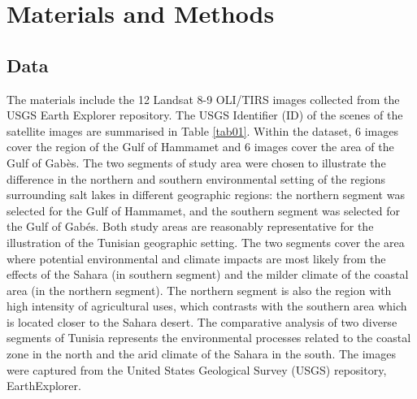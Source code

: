 \documentclass[land,article,accept,pdftex,moreauthors]{Definitions/mdpi}
\begin{document}
\section{Materials and Methods}

\subsection{Data}

The materials include the 12 Landsat 8-9 OLI/TIRS images collected from the USGS Earth Explorer repository. The USGS Identifier (ID) of the scenes of the satellite images are summarised in Table \ref{tab01}. Within the dataset, 6 images cover the region of the Gulf of Hammamet %
and 6 images cover the area of the Gulf of Gabès. {The two segments of study area were chosen to illustrate the difference in the northern and southern environmental setting of the regions surrounding salt lakes in different geographic regions: the northern segment was selected for the Gulf of Hammamet, and the southern segment was selected for the Gulf of Gab\'es. Both study areas are reasonably representative for the illustration of the Tunisian geographic setting. The two segments cover the area where potential environmental and climate impacts are most likely from the effects of the Sahara (in southern segment) and the milder climate of the coastal area (in the northern segment). The northern segment is also the region with high intensity of agricultural uses, which contrasts with the southern area which is located closer to the Sahara desert. The comparative analysis of two diverse segments of Tunisia represents the environmental processes related to the coastal zone in the north and the arid climate of the Sahara in the south. The images were captured from the United States Geological Survey (USGS) repository, EarthExplorer.}
\end{document}
